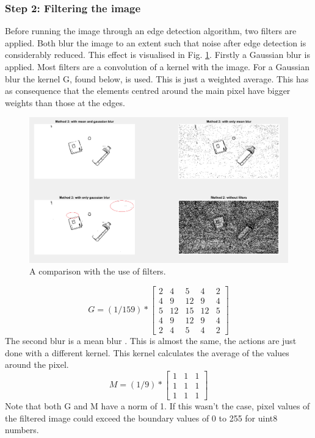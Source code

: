 \documentclass{article}
\begin{document}
\subsubsection{Step 2: Filtering the image}
Before running the image through an edge detection algorithm, two filters are applied. Both blur the image to an extent such that noise after edge detection is considerably reduced. This effect is visualised in Fig. \ref{fig:filter_comparison}.
Firstly a Gaussian blur\cite{gaussian} is applied. Most filters are a convolution of a kernel with the image. For a Gaussian blur the kernel G, found below, is used. This is just a weighted average. This has as consequence that the elements centred around the main pixel have bigger weights than those at the edges.
\begin{figure}[h]
\center
\includegraphics[width=0.7\linewidth]{filter_comparison.png}
\caption{A comparison with the use of filters.}
\label{fig:filter_comparison}
\end{figure}
\begin{equation}
G = (1/159) * 
\begin{bmatrix}
2 & 4 & 5 & 4 & 2\\
4 & 9 & 12 & 9 & 4\\
5 & 12 & 15 & 12 & 5\\
4 & 9 & 12 & 9& 4\\
2 & 4 & 5 & 4 & 2
\end{bmatrix}
\end{equation}
The second blur is a mean blur \cite{mean}. This is almost the same, the actions are just done with a different kernel. This kernel calculates the average of the values around the pixel.
\begin{equation}
M = (1/9) * 
\begin{bmatrix}
1&1&1\\
1&1&1\\
1&1&1
\end{bmatrix}
\end{equation}
Note that both G and M have a norm of 1. If this wasn't the case, pixel values of the filtered image could exceed the boundary values of 0 to 255 for uint8 numbers. 
\end{document}
